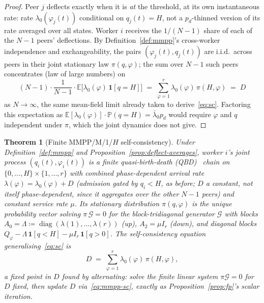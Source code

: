 \documentclass[11pt,a4paper]{report}
\newtheorem{theorem}{Theorem}[section]
\begin{document}
\begin{proof}
Peer $j$ deflects exactly when it is \emph{at} the threshold, at its
own instantaneous rate: rate $\lambda_0(\varphi_j(t))$ conditional on
$q_j(t)=H$, not a $p_d$-thinned version of its rate averaged over all
states. Worker $i$ receives the $1/(N-1)$ share of each of the $N-1$
peers' deflections. By Definition~\ref{def:mmpp}'s cross-worker
independence and exchangeability, the pairs $(\varphi_j(t),q_j(t))$
are i.i.d.\ across peers in their joint stationary law $\pi(q,\varphi)$;
the sum over $N-1$ such peers concentrates (law of large numbers) on
\[
  (N-1)\cdot\frac{1}{N-1}\cdot
  \mathbb{E}\bigl[\lambda_0(\varphi)\,\mathbf{1}[q=H]\bigr]
  \;=\;
  \sum_{\varphi=1}^r \lambda_0(\varphi)\,\pi(H,\varphi) \;=\; D
\]
as $N\to\infty$, the same mean-field limit already taken to
derive~\eqref{eq:sc}. Factoring this expectation as
$\mathbb{E}[\lambda_0(\varphi)]\cdot\mathbb{P}(q=H) = \bar\lambda_0 p_d$
would require $\varphi$ and $q$ independent under $\pi$, which the
joint dynamics does not give.
\end{proof}

\begin{theorem}[Finite MMPP/M/1/$H$ self-consistency]
\label{thm:mmpp-sc}
Under Definition~\ref{def:mmpp} and Proposition~\ref{prop:deflect-averages},
worker $i$'s joint process $(q_i(t),\varphi_i(t))$ is a finite
quasi-birth-death (QBD)~\cite{neuts1981,latouche1999} chain on
$\{0,\ldots,H\}\times\{1,\ldots,r\}$ with combined phase-dependent
arrival rate $\lambda(\varphi) = \lambda_0(\varphi) + D$ (admission
gated by $q_i<H$, as before; $D$ a constant, not itself phase-dependent,
since it aggregates over the \emph{other} $N-1$ peers) and constant
service rate $\mu$. Its stationary distribution $\pi(q,\varphi)$ is the
unique probability vector solving $\pi\,\mathcal{G} = 0$ for the
block-tridiagonal generator $\mathcal{G}$ with blocks
$A_0=\Lambda\coloneqq\operatorname{diag}(\lambda(1),\ldots,\lambda(r))$
(up), $A_2 = \mu I_r$ (down), and diagonal blocks
$Q_\varphi - \Lambda\,\mathbf{1}[q<H] - \mu I_r\,\mathbf{1}[q>0]$. The
self-consistency equation generalising~\eqref{eq:sc} is
\begin{equation}
  D \;=\; \sum_{\varphi=1}^r \lambda_0(\varphi)\,\pi(H,\varphi),
  \label{eq:mmpp-sc}
\end{equation}
a fixed point in $D$ found by alternating: solve the finite linear
system $\pi\mathcal{G}=0$ for $D$ fixed, then update $D$
via~\eqref{eq:mmpp-sc}, exactly as Proposition~\ref{prop:fp}'s scalar
iteration.
\end{theorem}
\end{document}
